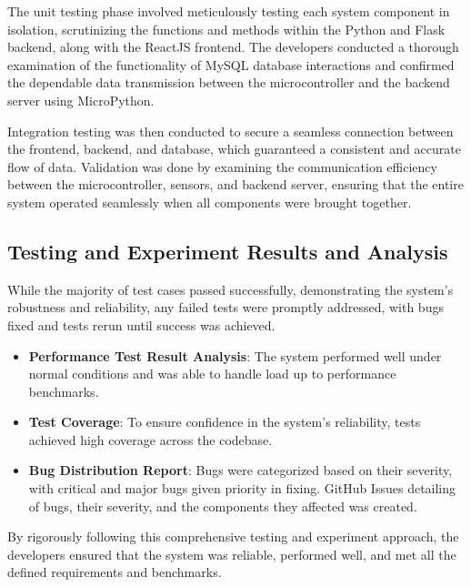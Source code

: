The unit testing phase involved meticulously testing each system component in isolation,
scrutinizing the functions and methods within the Python and Flask backend, along
with the ReactJS frontend. %
The developers conducted a thorough examination of the functionality of MySQL database interactions and confirmed the dependable data
transmission between the microcontroller and the backend server using MicroPython. %

Integration testing was then conducted to secure a seamless connection between
the frontend, backend, and database, which guaranteed a consistent and accurate
flow of data. %
Validation was done by examining the communication efficiency between the microcontroller, sensors, and backend server, ensuring that the entire system
operated seamlessly when all components were brought together. %

\subsection{Testing and Experiment Results and Analysis}\label{subsec:testing-and-experiment-results-and-analysis}

While the majority of test cases passed successfully, demonstrating the system’s
robustness and reliability, any failed tests were promptly addressed,
with bugs fixed and tests rerun until success was achieved. %

\begin{itemize}
    \item \textbf{Performance Test Result Analysis}: The system performed well
    under normal conditions and was able to handle load up to performance benchmarks. %
    \item \textbf{Test Coverage}: To ensure confidence in the system’s reliability,
    tests achieved high coverage across the codebase. %
    \item \textbf{Bug Distribution Report}: Bugs were categorized based on their
    severity, with critical and major bugs given priority in fixing.  %
    GitHub Issues detailing of bugs, their severity, and the components
    they affected was created. %
\end{itemize}


By rigorously following this comprehensive testing and experiment
approach, the developers ensured that the system was reliable,
performed well, and met all the defined requirements and benchmarks. %
